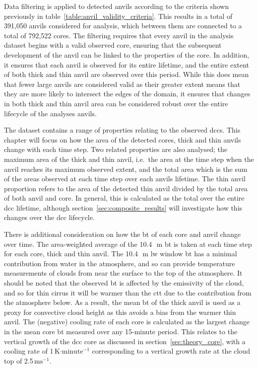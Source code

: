 Data filtering is applied to detected anvils according to the criteria shown previously in table~\ref{table:anvil_validity_criteria}.
This results in a total of 391,050 anvils considered for analysis, which between them are connected to a total of 792,522 cores.
The filtering requires that every anvil in the analysis dataset begins with a valid observed core, ensuring that the subsequent development of the anvil can be linked to the properties of the core.
In addition, it ensures that each anvil is observed for its entire lifetime, and the entire extent of both thick and thin anvil are observed over this period.
While this does mean that fewer large anvils are considered valid as their greater extent means that they are more likely to intersect the edges of the domain, it ensures that changes in both thick and thin anvil area can be considered robust over the entire lifecycle of the analyses anvils.

The dataset contains a range of properties relating to the observed \acrshort{dcc}s.
This chapter will focus on how the area of the detected cores, thick and thin anvils change with each time step.
Two related properties are also analysed; the maximum area of the thick and thin anvil, i.e.\ the area at the time step when the anvil reaches its maximum observed extent, and the total area which is the sum of the areas observed at each time step over each anvils lifetime.
The thin anvil proportion refers to the area of the detected thin anvil divided by the total area of both anvil and core.
In general, this is calculated as the total over the entire \acrshort{dcc} lifetime, although section~\ref{sec:composite_results} will investigate how this changes over the \acrshort{dcc} lifecycle.

There is additional consideration on how the \acrshort{bt} of each core and anvil change over time.
The area-weighted average of the 10.4\,\unit{\mu m} \acrshort{bt} is taken at each time step for each core, thick and thin anvil.
The 10.4\,\unit{\mu m} \acrshort{lw} window \acrshort{bt} has a minimal contribution from water in the atmosphere, and so can provide temperature measurements of clouds from near the surface to the top of the atmosphere.
It should be noted that the observed \acrshort{bt} is affected by the emissivity of the cloud, and so for thin cirrus it will be warmer than the \acrshort{ctt} due to the contribution from the atmosphere below.
As a result, the mean \acrshort{bt} of the thick anvil is used as a proxy for convective cloud height as this avoids a bias from the warmer thin anvil.
The (negative) cooling rate of each core is calculated as the largest change in the mean core \acrshort{bt} measured over any 15-minute period.
This relates to the vertical growth of the \acrshort{dcc} core as discussed in section~\ref{sec:theory_core}, with a cooling rate of 1\,K$\cdot\mathrm{minute^{-1}}$ corresponding to a vertical growth rate at the cloud top of 2.5\,$\mathrm{ms^{-1}}$.

